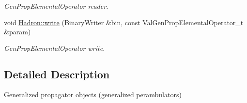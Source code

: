 \begin{DoxyCompactItemize}
\begin{DoxyCompactList}\small\item\em Gen\+Prop\+Elemental\+Operator reader. \end{DoxyCompactList}\item 
void \mbox{\hyperlink{namespaceHadron_a276bd4448f8f6233aa951856e912651e}{Hadron\+::write}} (Binary\+Writer \&bin, const Val\+Gen\+Prop\+Elemental\+Operator\+\_\+t \&param)
\begin{DoxyCompactList}\small\item\em Gen\+Prop\+Elemental\+Operator write. \end{DoxyCompactList}\end{DoxyCompactItemize}


\subsection{Detailed Description}
Generalized propagator objects (generalized perambulators) 

